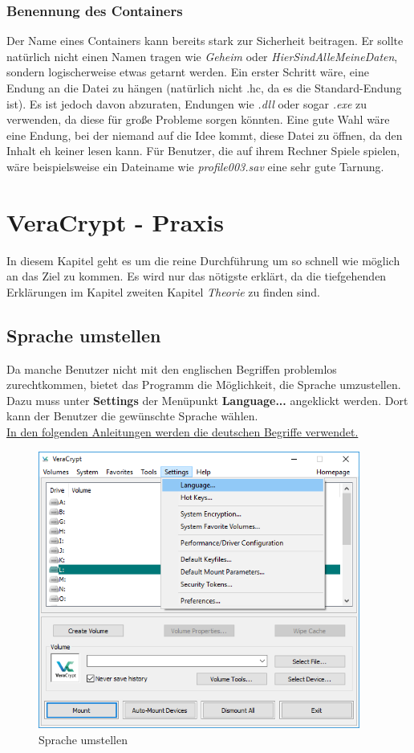 \documentclass[12pt,a4paper]{scrreprt}
\begin{document}
\subsection{Benennung des Containers}
Der Name eines Containers kann bereits stark zur Sicherheit beitragen. Er sollte natürlich nicht einen Namen tragen wie \textit{Geheim} oder \textit{HierSindAlleMeineDaten}, sondern logischerweise etwas getarnt werden. Ein erster Schritt wäre, eine Endung an die Datei zu hängen (natürlich nicht .hc, da es die Standard-Endung ist). Es ist jedoch davon abzuraten, Endungen wie \textit{.dll} oder sogar \textit{.exe} zu verwenden, da diese für große Probleme sorgen könnten. Eine gute Wahl wäre eine Endung, bei der niemand auf die Idee kommt, diese Datei zu öffnen, da den Inhalt eh keiner lesen kann. Für Benutzer, die auf ihrem Rechner Spiele spielen, wäre beispielsweise ein Dateiname wie \textit{profile003.sav} eine sehr gute Tarnung.

\chapter{VeraCrypt - Praxis}
In diesem Kapitel geht es um die reine Durchführung um so schnell wie möglich an das Ziel zu kommen. Es wird nur das nötigste erklärt, da die tiefgehenden Erklärungen im Kapitel zweiten Kapitel \textit{Theorie} zu finden sind.

\section{Sprache umstellen}
Da manche Benutzer nicht mit den englischen Begriffen problemlos zurechtkommen, bietet das Programm die Möglichkeit, die Sprache umzustellen. Dazu muss unter \textbf{Settings} der Menüpunkt \textbf{Language...} angeklickt werden. Dort kann der Benutzer die gewünschte Sprache wählen.\\

\noindent \underline{In den folgenden Anleitungen werden die deutschen Begriffe verwendet.}

\begin{figure}[h]
\begin{center}
\includegraphics[width=300pt]{media/changelanguage.png}
\caption{Sprache umstellen}
\label{changelanguage}
\end{center}
\end{figure}
\end{document}
